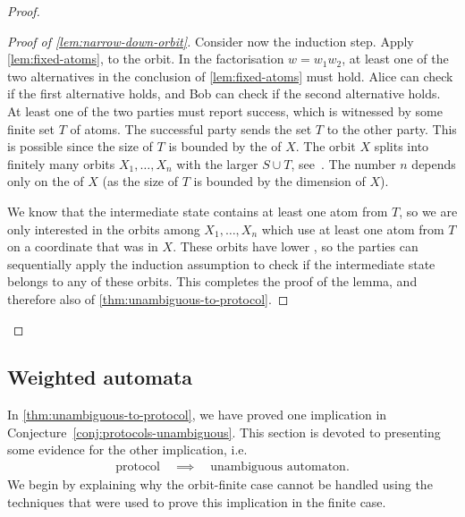 \begin{proof}
\begin{proof}[Proof of \cref{lem:narrow-down-orbit}]
  Consider now the induction step. Apply \cref{lem:fixed-atoms}, to the
  orbit. In the factorisation $w = w_1 w_2$, at least one of the two
  alternatives in the conclusion of \cref{lem:fixed-atoms} must hold. Alice
  can check if the first alternative holds, and Bob can check if the second
  alternative holds.  At least one of the two parties must report success,
  which is witnessed by some finite set $T$ of atoms. The successful party sends the
  set $T$ to the other party. This is possible since the size of $T$ is
  bounded by the  of $X$. 
  The orbit $X$ splits into finitely many
  orbits $X_1,\ldots,X_n$ with the larger  $S \cup T$, see~\cite[Lemma
  10.9]{bojanczyk_slightly}. The number $n$ depends only on the  
  of $X$ (as the size of $T$ is bounded by the dimension of $X$).

  We know that the intermediate state contains at least one atom from $T$, so
  we are only interested in the orbits among $X_1,\ldots,X_n$ which use at
  least one atom from $T$ on a coordinate that was  in $X$. 
  These orbits
  have lower , so the parties can sequentially apply the induction
  assumption to check if the intermediate state belongs to any of these
  orbits. This completes the proof of the lemma, and therefore also of
  \cref{thm:unambiguous-to-protocol}.
\end{proof}
\end{proof}


\subsection{Weighted automata}
\label{sec:weighted-automata-atoms}

\AP
In \cref{thm:unambiguous-to-protocol}, we have proved one implication in Conjecture~\ref{conj:protocols-unambiguous}.
This section is devoted to presenting some evidence for the other implication, i.e.
\begin{align}\label{eq:missing-orbit-finite-implication}
\text{protocol} \quad \implies \quad \text{unambiguous automaton}.
\end{align}
We begin by explaining why the orbit-finite case cannot be handled using the
techniques that were used to prove this implication in the finite case.

